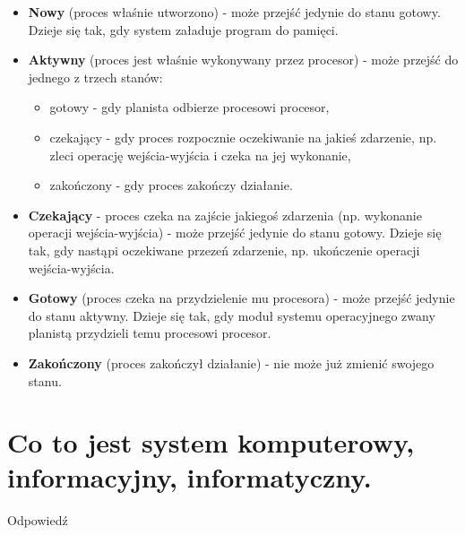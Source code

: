 \documentclass[12pt,a4paper]{article}
\begin{document}
	\begin{itemize}
		\item \textbf{Nowy} (proces właśnie utworzono) - może przejść jedynie do stanu gotowy. Dzieje się tak, gdy system załaduje program do pamięci.
		\item \textbf{Aktywny} (proces jest właśnie wykonywany przez procesor) - może przejść do jednego z trzech stanów:
		\begin{itemize}
			\item gotowy - gdy planista odbierze procesowi procesor,
			\item czekający - gdy proces rozpocznie oczekiwanie na jakieś zdarzenie, np. zleci operację wejścia-wyjścia i czeka na jej wykonanie,
			\item zakończony - gdy proces zakończy działanie.
		\end{itemize}
		\item \textbf{Czekający} - proces czeka na zajście jakiegoś zdarzenia (np. wykonanie operacji wejścia-wyjścia) -  może przejść jedynie do stanu gotowy. Dzieje się tak, gdy nastąpi oczekiwane przezeń zdarzenie, np. ukończenie operacji wejścia-wyjścia.
		\item \textbf{Gotowy} (proces czeka na przydzielenie mu procesora) - może przejść jedynie do stanu aktywny. Dzieje się tak, gdy moduł systemu operacyjnego zwany planistą przydzieli temu procesowi procesor.
		\item \textbf{Zakończony} (proces zakończył działanie) - nie może już zmienić swojego stanu.
	\end{itemize}

	\section{Co to jest system komputerowy, informacyjny, informatyczny.}
	Odpowiedź
\end{document}
